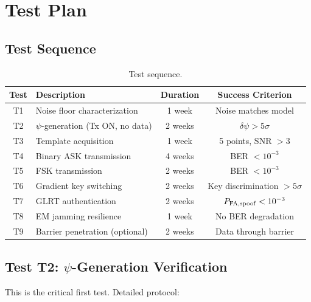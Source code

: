 \documentclass[11pt,onecolumn]{article}
\begin{document}
\section{Test Plan}

\subsection{Test Sequence}

\begin{table}[H]
\centering
\caption{Test sequence.}
\label{tab:test-sequence}
\begin{tabular}{clcc}
\toprule
Test & Description & Duration & Success Criterion \\
\midrule
T1 & Noise floor characterization & 1 week & Noise matches model \\
T2 & $\psi$-generation (Tx ON, no data) & 2 weeks & $\delta\psi > 5\sigma$ \\
T3 & Template acquisition & 1 week & 5 points, SNR $> 3$ \\
T4 & Binary ASK transmission & 4 weeks & BER $< 10^{-3}$ \\
T5 & FSK transmission & 2 weeks & BER $< 10^{-3}$ \\
T6 & Gradient key switching & 2 weeks & Key discrimination $> 5\sigma$ \\
T7 & GLRT authentication & 2 weeks & $P_{\rm FA,spoof} < 10^{-3}$ \\
T8 & EM jamming resilience & 1 week & No BER degradation \\
T9 & Barrier penetration (optional) & 2 weeks & Data through barrier \\
\bottomrule
\end{tabular}
\end{table}

\subsection{Test T2: $\psi$-Generation Verification}

This is the critical first test.
Detailed protocol:
\end{document}
